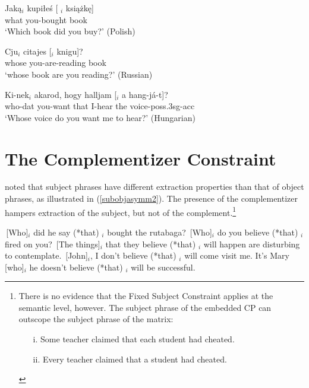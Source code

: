 \documentclass[output=paper]{langsci/langscibook}
\begin{document}
\ea
 \ea \gll Jak\k{a}$_i$  kupi\l{}e\'{s} { [ \spc$_i$ } ksi\k{a}\.{z}k\k{e}]\\
     what  you-bought  {} book\\
    \glt `Which book did you buy?' \hfill (Polish)
       
 \ex \gll Cju$_i$  citajes [\spc$_i$  knigu]?\\
 whose  you-are-reading {}  book\\
  \glt `whose book are you reading?' \hfill (Russian)
 
 \ex \gll Ki-nek$_i$  akarod,  hogy  halljam  {[\spc$_i$}  a  hang-j\'{a}-t]?\\
 who-{\sc dat}  you-want  that  I-hear {} the  voice-{\sc poss.3sg-acc}\\ 
\glt `Whose voice do you want me to hear?' \hfill (Hungarian)
 \z \label{lbcx}
 \z
 



 
 
\section{The Complementizer Constraint}

\citet{Perlmutter68} noted that subject phrases have different extraction properties than that of object phrases, as illustrated in (\ref{subobjasymm2}). The presence of the complementizer hampers extraction of the subject, but not of the complement.\footnote{There is no evidence that the Fixed Subject Constraint applies at the semantic level, however. The  subject phrase of the embedded CP can outscope the subject phrase of  the matrix:

\begin{itemize}
\item[i.] Some teacher claimed that each student had cheated.
\item[ii.] Every teacher claimed that a student had cheated.
\end{itemize}
} 

\ea 
\ea \,[Who]$_i$ did he say (*that) \spc$_i$ bought the rutabaga?
\ex \,[Who]$_i$ do you believe (*that) \spc$_i$ fired on you? 
\ex \,[The things]$_i$ that they believe (*that) \spc$_i$ will happen are disturbing to contemplate. 
\ex \,[John]$_i$, I don't believe (*that) \spc$_i$ will come visit me. 
\ex It's Mary [who]$_i$ he doesn't believe (*that) \spc$_i$ will be successful.
\z \label{subobjasymm2}
\z
\end{document}
